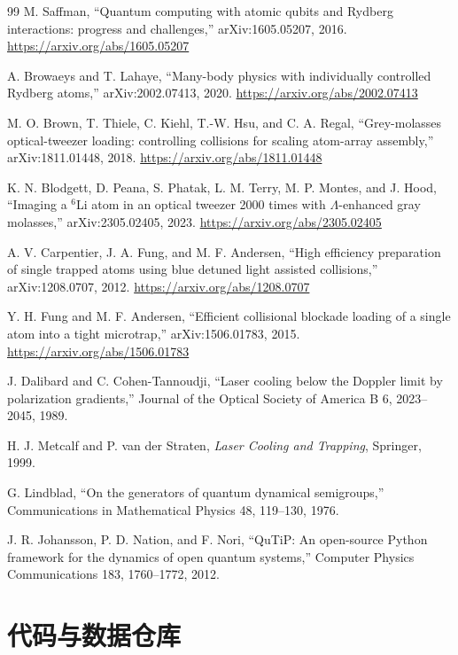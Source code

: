 \documentclass[UTF8,a4paper,12pt]{ctexart}
\begin{document}
\begin{thebibliography}{99}
M. Saffman, ``Quantum computing with atomic qubits and Rydberg interactions: progress and challenges,'' arXiv:1605.05207, 2016. \url{https://arxiv.org/abs/1605.05207}

A. Browaeys and T. Lahaye, ``Many-body physics with individually controlled Rydberg atoms,'' arXiv:2002.07413, 2020. \url{https://arxiv.org/abs/2002.07413}

M. O. Brown, T. Thiele, C. Kiehl, T.-W. Hsu, and C. A. Regal, ``Grey-molasses optical-tweezer loading: controlling collisions for scaling atom-array assembly,'' arXiv:1811.01448, 2018. \url{https://arxiv.org/abs/1811.01448}

K. N. Blodgett, D. Peana, S. Phatak, L. M. Terry, M. P. Montes, and J. Hood, ``Imaging a $^6$Li atom in an optical tweezer 2000 times with $\Lambda$-enhanced gray molasses,'' arXiv:2305.02405, 2023. \url{https://arxiv.org/abs/2305.02405}

A. V. Carpentier, J. A. Fung, and M. F. Andersen, ``High efficiency preparation of single trapped atoms using blue detuned light assisted collisions,'' arXiv:1208.0707, 2012. \url{https://arxiv.org/abs/1208.0707}

Y. H. Fung and M. F. Andersen, ``Efficient collisional blockade loading of a single atom into a tight microtrap,'' arXiv:1506.01783, 2015. \url{https://arxiv.org/abs/1506.01783}

J. Dalibard and C. Cohen-Tannoudji, ``Laser cooling below the Doppler limit by polarization gradients,'' Journal of the Optical Society of America B 6, 2023--2045, 1989.

H. J. Metcalf and P. van der Straten, \textit{Laser Cooling and Trapping}, Springer, 1999.

G. Lindblad, ``On the generators of quantum dynamical semigroups,'' Communications in Mathematical Physics 48, 119--130, 1976.

J. R. Johansson, P. D. Nation, and F. Nori, ``QuTiP: An open-source Python framework for the dynamics of open quantum systems,'' Computer Physics Communications 183, 1760--1772, 2012.
\end{thebibliography}

\appendix

\section{代码与数据仓库}
\end{document}
